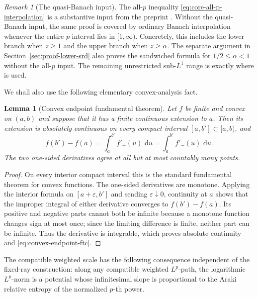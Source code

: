 \documentclass[12pt]{article}
\numberwithin{equation}{section}
\newtheorem{lemma}[theorem]{Lemma}
\theoremstyle{definition}
\theoremstyle{remark}
\newtheorem{remark}[theorem]{Remark}
\newcommand{\dd}{\,\mathrm d}
\newcommand{\?}{\overset{?}{=}}
\begin{document}
\begin{remark}[The quasi-Banach input]
\label{rem:quasi-banach-input}
The all-$p$ inequality \eqref{eq:core-all-p-interpolation} is a substantive
input from the preprint \cite{Gu:2019jfc}.  Without the quasi-Banach input, the
same proof is covered by ordinary Banach interpolation
\cite{KOSAKI198429,Terp:1981lp} whenever
the entire $p$ interval lies in $[1,\infty)$.  Concretely, this includes
the lower branch when $z\geq1$ and the upper branch when $z\geq\alpha$.
The separate argument in Section~\ref{sec:proof-lower-srd} also proves the
sandwiched formula for $1/2\leq\alpha<1$ without the all-$p$ input.  The
remaining unrestricted sub-$L^1$ range is exactly where
\cite{Gu:2019jfc} is used.
\end{remark}

We shall also use the following elementary convex-analysis fact.

\begin{lemma}[Convex endpoint fundamental theorem]
\label{lem:convex-endpoint-ftc}
Let $f$ be finite and convex on $(a,b)$ and suppose that it has a finite
continuous extension to $a$.  Then its extension is absolutely continuous
on every compact interval $[a,b']\subset[a,b)$, and
\begin{equation}
  f(b')-f(a)=\int_a^{b'}f'_+(u)\,\dd u
             =\int_a^{b'}f'_-(u)\,\dd u.
  \label{eq:convex-endpoint-ftc}
\end{equation}
The two one-sided derivatives agree at all but at most countably many points.
\end{lemma}

\begin{proof}
On every interior compact interval this is the standard fundamental
theorem for convex functions.  The one-sided derivatives are monotone.
Applying the interior formula on $[a+\varepsilon,b']$ and sending
$\varepsilon\downarrow0$, continuity at $a$ shows that the improper
integral of either derivative converges to $f(b')-f(a)$.  Its positive and
negative parts cannot both be infinite because a monotone function changes
sign at most once; since the limiting difference is finite, neither part
can be infinite.  Thus the derivative is integrable, which proves
absolute continuity and \eqref{eq:convex-endpoint-ftc}.
\end{proof}

The compatible weighted scale has the following consequence 
independent of the fixed-ray construction: along any compatible weighted $L^p$-path, the logarithmic $L^p$-norm is a potential whose infinitesimal slope is proportional to the Araki relative entropy of the normalized $p$-th power.
\end{document}
